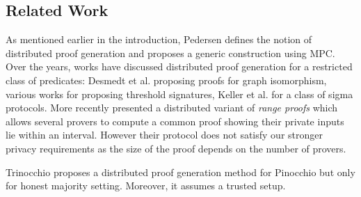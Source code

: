 %
%
\subsection{Related Work}\label{sec:relatedwork}
As mentioned earlier in the introduction, Pedersen \cite{Ped92} defines the
notion of distributed proof generation and proposes a generic construction using
MPC. Over the years, works have discussed distributed proof generation for a
restricted class of predicates: Desmedt et al. \cite{DDB94} proposing proofs for
graph isomorphism, various works \cite{King05, DDS, Desmedt2011} for proposing
threshold signatures, Keller et al. \cite{EfficientTZ} for a class of sigma
protocols. 
{ More recently \cite{bulletproofs} presented a distributed variant of {\em range proofs} which allows
several provers to compute a common proof showing their private inputs lie within an interval. However their protocol
does not satisfy our stronger privacy requirements as the size of the proof depends on the number of provers.}

Trinocchio \cite{trinocchio} proposes a distributed proof generation method for
Pinocchio  \cite{pinnochio_PHGR} but only for honest majority setting. Moreover, it assumes a trusted setup. 

